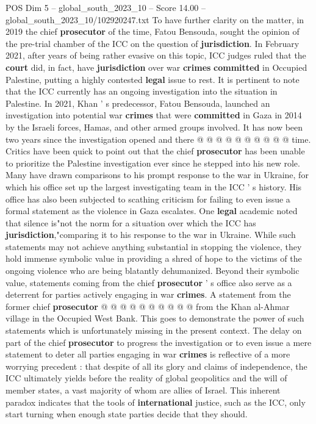 \begin{textsample}{POS Dim 5 – global\_south\_2023\_10 – Score 14.00 – global\_south\_2023\_10/102920247.txt}
To have further clarity on the matter, in 2019 the chief \textbf{prosecutor} of the time, Fatou Bensouda, sought the opinion of the pre-trial chamber of the ICC on the question of \textbf{jurisdiction}.
In February 2021, after years of being rather evasive on this topic, ICC judges ruled that the \textbf{court} did, in fact, have \textbf{jurisdiction} over war \textbf{crimes} \textbf{committed} in Occupied Palestine, putting a highly contested \textbf{legal} issue to rest.
It is pertinent to note that the ICC currently has an ongoing investigation into the situation in Palestine.
In 2021, Khan ' s predecessor, Fatou Bensouda, launched an investigation into potential war \textbf{crimes} that were \textbf{committed} in Gaza in 2014 by the Israeli forces, Hamas, and other armed groups involved.
It has now been two years since the investigation opened and there @ @ @ @ @ @ @ @ @ @ time.
Critics have been quick to point out that the chief \textbf{prosecutor} has been unable to prioritize the Palestine investigation ever since he stepped into his new role.
Many have drawn comparisons to his prompt response to the war in Ukraine, for which his office set up the largest investigating team in the ICC ' s history.
His office has also been subjected to scathing criticism for failing to even issue a formal statement as the violence in Gaza escalates.
One \textbf{legal} academic noted that silence is"not the norm for a situation over which the ICC has \textbf{jurisdiction},"comparing it to his response to the war in Ukraine.
While such statements may not achieve anything substantial in stopping the violence, they hold immense symbolic value in providing a shred of hope to the victims of the ongoing violence who are being blatantly dehumanized.
Beyond their symbolic value, statements coming from the chief \textbf{prosecutor} ' s office also serve as a deterrent for parties actively engaging in war \textbf{crimes}.
A statement from the former chief \textbf{prosecutor} @ @ @ @ @ @ @ @ @ @ from the Khan al-Ahmar village in the Occupied West Bank.
This goes to demonstrate the power of such statements which is unfortunately missing in the present context.
The delay on part of the chief \textbf{prosecutor} to progress the investigation or to even issue a mere statement to deter all parties engaging in war \textbf{crimes} is reflective of a more worrying precedent : that despite of all its glory and claims of independence, the ICC ultimately yields before the reality of global geopolitics and the will of member states, a vast majority of whom are allies of Israel.
This inherent paradox indicates that the tools of \textbf{international} justice, such as the ICC, only start turning when enough state parties decide that they should.

\end{textsample}
